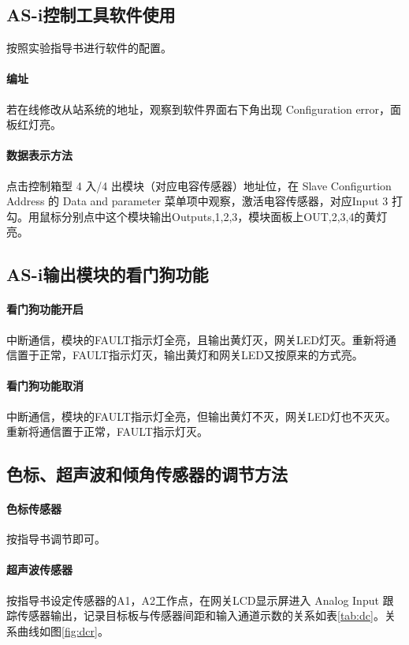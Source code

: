 \subsection{AS-i控制工具软件使用}
按照实验指导书进行软件的配置。
\paragraph{编址}
若在线修改从站系统的地址，观察到软件界面右下角出现 {\ttfamily Configuration error}，面板红灯亮。
\paragraph{数据表示方法}
点击控制箱型 4 入/4 出模块（对应电容传感器）地址位，在 {\ttfamily Slave Configurtion Address} 的 {\ttfamily Data and parameter} 菜单项中观察，激活电容传感器，对应Input 3 打勾。用鼠标分别点中这个模块输出Outputs,1,2,3，模块面板上OUT,2,3,4的黄灯亮。

\subsection{AS-i输出模块的看门狗功能}
\paragraph{看门狗功能开启}
中断通信，模块的FAULT指示灯全亮，且输出黄灯灭，网关LED灯灭。重新将通信置于正常，FAULT指示灯灭，输出黄灯和网关LED又按原来的方式亮。
\paragraph{看门狗功能取消}
中断通信，模块的FAULT指示灯全亮，但输出黄灯不灭，网关LED灯也不灭灭。重新将通信置于正常，FAULT指示灯灭。

\subsection{色标、超声波和倾角传感器的调节方法}
\paragraph{色标传感器} 按指导书调节即可。
\paragraph{超声波传感器} 按指导书设定传感器的A1，A2工作点，在网关LCD显示屏进入 {\ttfamily Analog Input} 跟踪传感器输出，记录目标板与传感器间距和输入通道示数的关系如表\ref{tab:dc}。关系曲线如图\ref{fig:dcr}。

